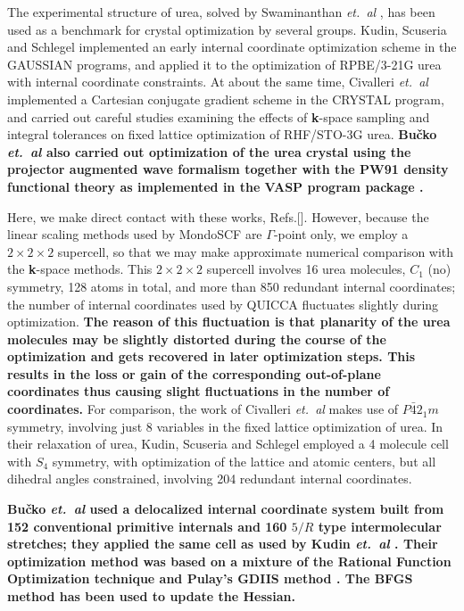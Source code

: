 \twolinestyle{\documentclass[prb,preprint]{revtex4}}
\begin{document}
The experimental structure of urea, solved by Swaminanthan {\em et.~al} \cite{SSwaminathan84},
has been used as a benchmark for crystal optimization by several groups.  
Kudin, Scuseria and Schlegel \cite{KKudin01} implemented an early internal coordinate 
optimization scheme in the GAUSSIAN programs, and applied it to the optimization of
RPBE/3-21G urea with internal coordinate constraints.  At about the same time,  
Civalleri {\em et.~al} \cite{BCivalleri01} implemented a Cartesian conjugate gradient 
scheme in the CRYSTAL program, and carried out careful studies examining the effects of 
{\bf k}-space sampling and integral tolerances on fixed lattice optimization of RHF/STO-3G urea.
{\bf
Bu\v{c}ko {\em et.~al} \cite{TBucko05} also carried out optimization of the
urea crystal using the projector augmented wave formalism together with the PW91
density functional theory as implemented in the VASP program package \cite{GKresse96}. 
}

Here, we make direct contact with these works, Refs.[].
However, because the linear scaling methods used by {\sc MondoSCF} are $\Gamma$-point only, 
we employ a $2\times2\times2$ supercell, so that we may make approximate numerical 
comparison with the {\bf k}-space methods.  This $2\times2\times2$ supercell involves 
16 urea molecules, $C_1$ (no) symmetry, 128 atoms in total, and more than 850 redundant internal 
coordinates;  the number of internal coordinates used by QUICCA fluctuates slightly during optimization.  
{\bf
The reason of this fluctuation is that planarity of the urea molecules
may be slightly distorted during the course of the optimization and gets 
recovered in later optimization steps. This results
in the loss or gain of the corresponding out-of-plane coordinates thus
causing slight fluctuations in the number of coordinates.
}
For comparison, the work of Civalleri {\em et.~al} \cite{BCivalleri01} makes use of $P\bar{4}2_1m$ 
symmetry, involving just 8 variables in the fixed lattice optimization of urea.  In their 
relaxation of urea, Kudin, Scuseria and Schlegel \cite{KKudin01} 
employed a 4 molecule cell with $S_4$ symmetry, with optimization of the lattice and 
atomic centers, but all dihedral angles constrained, involving 204 redundant internal 
coordinates.

{\bf
Bu\v{c}ko {\em et.~al} \cite{TBucko05} used a delocalized internal coordinate system built
from 152 conventional primitive internals and 160 $5/R$ type intermolecular
stretches; they applied the same cell as used by Kudin {\em et.~al} \cite{KKudin01}.
Their optimization method was based on a mixture of the Rational Function 
Optimization technique and Pulay's GDIIS method \cite{FEckert97}. 
The BFGS method \cite{RFletcher81} has been used to update the Hessian.
}
\end{document}
